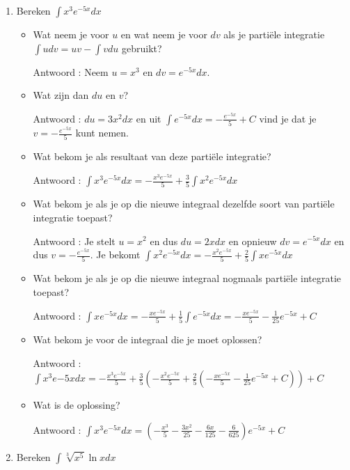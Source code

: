 \documentclass{article}
\begin{document}
\begin{enumerate}

\item Bereken $\int x^3e^{-5x}dx$

\begin{itemize}
\item Wat neem je voor $u$ en wat neem je voor $dv$ als je parti\"ele integratie $\int udv = uv -\int vdu$ gebruikt?

Antwoord : Neem $u=x^3$ en $dv=e^{-5x}dx$.

\item Wat zijn dan $du$ en $v$?

Antwoord : $du=3x^2dx$ en uit $\int e^{-5x}dx=-\frac {e^{-5x}}{5} +C$ vind je dat je $v=-\frac {e^{-5x}}{5}$ kunt nemen.

\item Wat bekom je als resultaat van deze partiële integratie?

Antwoord : $\int x^3e^{-5x}dx = - \frac {x^3e^{-5x}}{5}+\frac {3}{5} \int x^2e^{-5x}dx$

\item Wat bekom je als je op die nieuwe integraal dezelfde soort van parti\"ele integratie toepast?

Antwoord : Je stelt $u=x^2$ en dus $du=2xdx$ en opnieuw $dv=e^{-5x}dx$ en dus $v=-\frac {e^{-5x}}{5}$.
Je bekomt $\int x^2e^{-5x}dx =  - \frac {x^2e^{-5x}}{5}+\frac {2}{5} \int xe^{-5x}dx$

\item Wat bekom je als je op die nieuwe integraal nogmaals parti\"ele integratie toepast?

Antwoord : $\int xe^{-5x}dx = - \frac {xe^{-5x}}{5}+\frac {1}{5} \int e^{-5x}dx= - \frac {xe^{-5x}}{5}-\frac{1}{25}e^{-5x}+C$

\item Wat bekom je voor de integraal die je moet oplossen?

Antwoord : $\int x^3e{-5x}dx = - \frac {x^3e^{-5x}}{5}+\frac {3}{5} \left(  - \frac {x^2e^{-5x}}{5}+\frac {2}{5} \left( - \frac {xe^{-5x}}{5}-\frac{1}{25}e^{-5x}+C  \right)   \right)+C
$

\item Wat is de oplossing?

Antwoord : $\int x^3e^{-5x}dx = \left( -\frac{x^3}{5}-\frac{3x^2}{25}-\frac{6x}{125}-\frac{6}{625}   \right)e^{-5x}+C$

\end{itemize}

\item Bereken $\int \sqrt[3]{x^5} \ln x dx$


\end{enumerate}
\end{document}
